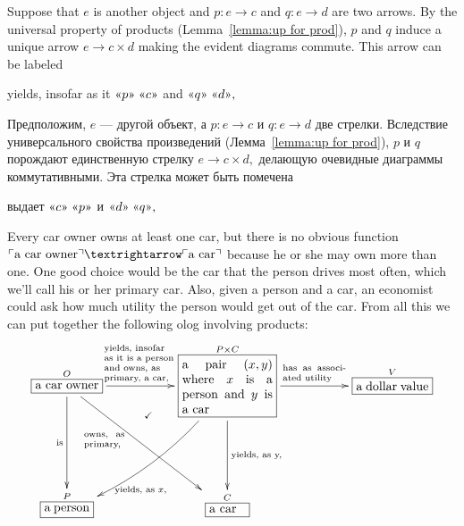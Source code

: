 \documentclass[../main/CT4S-EN-RU]{subfiles}
\begin{document}
\begin{blockENG}
Suppose that $e$ is another object and $p\colon e{→} c$ and $q\colon e{→} d$ are two arrows. By the universal property of products (Lemma~\ref{lemma:up for prod}), $p$ and $q$ induce a unique arrow $e{→} c\times d$ making the evident diagrams commute. This arrow can be labeled
\begin{center}
yields, insofar as it $\qtR{p}\;\qtR{c}$ and $\qtR{q}\;\qtR{d},$ 
\end{center}
\end{blockENG}

\begin{blockRUS}
Предположим, $e$ — другой объект, а $p\colon e{→} c$ и $q\colon e{→} d$ две стрелки. Вследствие универсального свойства произведений (Лемма~\ref{lemma:up for prod}), $p$ и $q$ порождают единственную стрелку $e{→} c\times d,$ делающую очевидные диаграммы коммутативными. Эта стрелка может быть помечена
\begin{center}
выдает $\qtR{c}\;\qtR{p}$ и $\qtR{d}\;\qtR{q},$ 
\end{center}
\end{blockRUS}

\begin{exampleENG}
Every car owner owns at least one car, but there is no obvious function $\fakebox{a car owner}{→}\fakebox{a car}$ because he or she may own more than one. One good choice would be the car that the person drives most often, which we'll call his or her primary car. Also, given a person and a car, an economist could ask how much utility the person would get out of the car. From all this we can put together the following olog involving products:
$$
\xymatrixnocompile{\obox{O}{.7in}{a car owner}\LAL{dd}{is}\ar[ddrr]_(.35){\parbox{.45in}{\scriptsize owns, as primary,}}\LA{rr}{\parbox{.8in}{\raggedright\scriptsize yields, insofar as it is a person and owns, as primary, a car,}}&\ar@{}[d]^(.4){\checkmark}&
\obox{P\times C}{1in}{a pair $(x,y)$ where $x$ is a person and $y$ is a car}\ar@/^1pc/[ddll]^(.7){\tn{yields, as }x,}\LA{dd}{\tn{yields, as }y,}\LA{rr}{\parbox{.7in}{\scriptsize has as associated utility}}&&\obox{V}{.8in}{a dollar value}\\&&\\\obox{P}{.5in}{a person}&&\obox{C}{.4in}{a car}
}
$$
\end{exampleENG}
\end{document}
